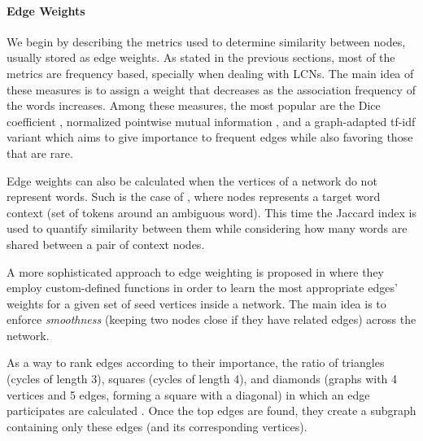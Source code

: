 \paragraph{Edge Weights}

We begin by describing the metrics used to determine similarity between nodes, usually stored as edge weights. As stated in the previous sections, most of the metrics are frequency based, specially when dealing with LCNs. The main idea of these measures is to assign a weight that decreases as the association frequency of the words increases. Among these measures, the most popular are the Dice  coefficient \cite{2010.Navigli.InducingWordSenses.Triangles,2011.DiMarco.Navigli.ClusteringWebSearch,2013.DiMarco.Navigli.ClusteringGraph-BasedWSI}, normalized pointwise mutual information \cite{2013.Hope.GradedWSI}, and a graph-adapted tf-idf variant \cite{2007.Tsatsaronis.WSDwithSpreading} which aims to give importance to frequent edges while also favoring those that are rare.

Edge weights can also be calculated when the vertices of a network do not represent words. Such is the case of \cite{2010.Klapaftis.WSD.WSD.HierarchicalGraphs}, where nodes represents a target word context (set of tokens around an ambiguous word). This time the Jaccard index is used to quantify similarity between them while considering how many words are shared between a pair of context nodes.


A  more sophisticated approach to edge weighting is proposed in \cite{2013.Saluja.Graph-BasedUnsupervisedLearning} where they employ  custom-defined functions in order to learn the most appropriate edges' weights for a given set of seed vertices inside a network. The main idea  is to enforce \textit{smoothness} (keeping two nodes close if they have related edges) across the network.

As a way to rank edges according to their importance, the ratio of triangles (cycles of length 3), squares (cycles of length 4), and diamonds (graphs with 4 vertices and 5 edges, forming a square with a diagonal) in which an edge participates are calculated \cite{2010.Navigli.InducingWordSenses.Triangles,2013.DiMarco.Navigli.ClusteringGraph-BasedWSI}. Once the top edges are found, they create a subgraph containing only these edges (and its corresponding vertices).

